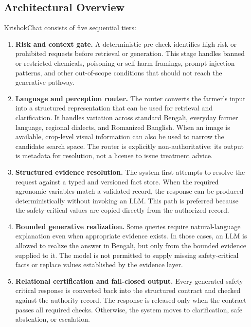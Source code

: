 \documentclass[a4paper,fleqn]{cas-dc}
\begin{document}
\subsection{Architectural Overview}

KrishokChat consists of five sequential tiers:
\begin{enumerate}
    \item[\textbf{Tier~0}] \textbf{Risk and context gate.} A deterministic pre-check identifies high-risk or prohibited requests before retrieval or generation. This stage handles banned or restricted chemicals, poisoning or self-harm framings, prompt-injection patterns, and other out-of-scope conditions that should not reach the generative pathway.
    \item[\textbf{Tier~1}] \textbf{Language and perception router.} The router converts the farmer's input into a structured representation that can be used for retrieval and clarification. It handles variation across standard Bengali, everyday farmer language, regional dialects, and Romanized Banglish. When an image is available, crop-level visual information can also be used to narrow the candidate search space. The router is explicitly non-authoritative: its output is metadata for resolution, not a license to issue treatment advice.
    \item[\textbf{Tier~2}] \textbf{Structured evidence resolution.} The system first attempts to resolve the request against a typed and versioned fact store. When the required agronomic variables match a validated record, the response can be produced deterministically without invoking an LLM. This path is preferred because the safety-critical values are copied directly from the authorized record.
    \item[\textbf{Tier~3}] \textbf{Bounded generative realization.} Some queries require natural-language explanation even when appropriate evidence exists. In those cases, an LLM is allowed to realize the answer in Bengali, but only from the bounded evidence supplied to it. The model is not permitted to supply missing safety-critical facts or replace values established by the evidence layer.
    \item[\textbf{Tier~4}] \textbf{Relational certification and fail-closed output.} Every generated safety-critical response is converted back into the structured contract and checked against the authority record. The response is released only when the contract passes all required checks. Otherwise, the system moves to clarification, safe abstention, or escalation.
\end{enumerate}
\end{document}
